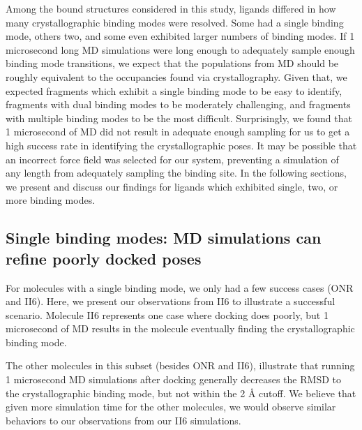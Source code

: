 Among the bound structures considered in this study, ligands differed in how many crystallographic binding modes were resolved. 
Some had a single binding mode, others two, and some even exhibited larger numbers of binding modes.
If 1 microsecond long MD simulations were long enough to adequately sample enough binding mode transitions, we expect that the populations from MD should be roughly equivalent to the occupancies found via crystallography.
Given that, we expected fragments which exhibit a single binding mode to be easy to identify, fragments with dual binding modes to be moderately challenging, and fragments with multiple binding modes to be the most difficult.
Surprisingly, we found that 1 microsecond of MD did not result in adequate enough sampling for us to get a high success rate in identifying the crystallographic poses. 
It may be possible that an incorrect force field was selected for our system, preventing a simulation of any length from adequately sampling the binding site.
In the following sections, we present and discuss our findings for ligands which exhibited single, two, or more binding modes.

\subsection{Single binding modes: MD simulations can refine poorly docked poses}
For molecules with a single binding mode, we only had a few success cases (ONR and II6). 
Here, we present our observations from II6 to illustrate a successful scenario. 
Molecule II6 represents one case where docking does poorly, but 1 microsecond of MD results in the molecule eventually finding the crystallographic binding mode.

The other molecules in this subset (besides ONR and II6), illustrate that running 1 microsecond MD simulations after docking generally decreases the RMSD to the crystallographic binding mode, but not within the 2 {\AA} cutoff.
We believe that given more simulation time for the other molecules, we would observe similar behaviors to our observations from our II6 simulations.


